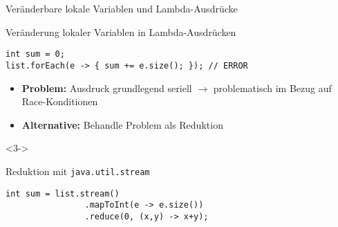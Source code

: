 \begin{frame}[fragile]{Veränderbare lokale Variablen und Lambda-Ausdrücke}
    \begin{center}
        \begin{minipage}[b]{0.75\textwidth}
            \begin{block}{Veränderung lokaler Variablen in Lambda-Ausdrücken \citep{goetz13}}                
                \begin{lstlisting}
int sum = 0;
list.forEach(e -> { sum += e.size(); }); // ERROR
                \end{lstlisting}    
            \end{block}
        \end{minipage}
    \end{center}   

    \begin{itemize}
        \item<2-> \textbf{Problem:} Ausdruck grundlegend seriell $\rightarrow$ problematisch 
        im Bezug auf Race-Konditionen
        \item<3-> \textbf{Alternative:} Behandle Problem als Reduktion
    \end{itemize}
    \begin{onlyenv}<3->
        \begin{center}
            \begin{minipage}[b]{0.75\textwidth}
                \begin{block}{Reduktion mit \texttt{java.util.stream} \citep{goetz13}}                
                    \begin{lstlisting}
int sum = list.stream()
                .mapToInt(e -> e.size())
                .reduce(0, (x,y) -> x+y);
                    \end{lstlisting}        
                \end{block}
            \end{minipage}
        \end{center}
    \end{onlyenv}   

\end{frame}